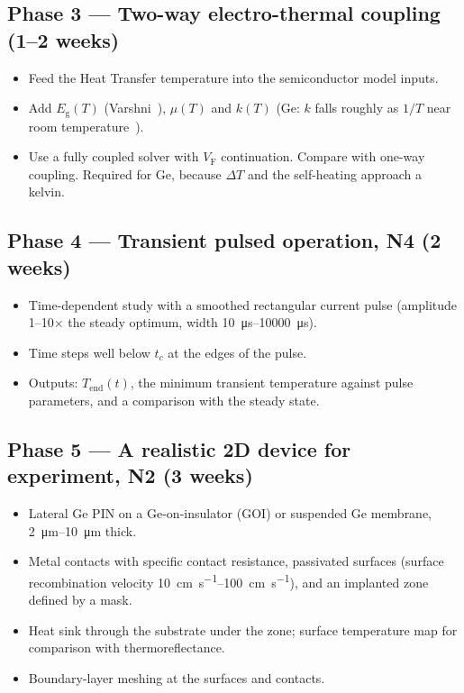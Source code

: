\documentclass[11pt,a4paper]{article}
\newcommand{\Eg}{E_{\mathrm{g}}}
\newcommand{\VF}{V_{\mathrm{F}}}
\begin{document}
\subsection*{Phase 3 --- Two-way electro-thermal coupling (1--2 weeks)}
\begin{itemize}
  \item Feed the Heat Transfer temperature into the semiconductor model inputs.
  \item Add $\Eg(T)$ (Varshni~\cite{varshni}), $\mu(T)$ and $k(T)$ (Ge: $k$ falls roughly as $1/T$ near room temperature~\cite{glassbrenner}).
  \item Use a fully coupled solver with $\VF$ continuation. Compare with one-way coupling. Required for Ge, because $\Delta T$ and the self-heating approach a kelvin.
\end{itemize}

\subsection*{Phase 4 --- Transient pulsed operation, N4 (2 weeks)}
\begin{itemize}
  \item Time-dependent study with a smoothed rectangular current pulse (amplitude 1--10$\times$ the steady optimum, width \SIrange{10}{10000}{\micro\second}).
  \item Time steps well below $t_c$ at the edges of the pulse.
  \item Outputs: $T_{\mathrm{end}}(t)$, the minimum transient temperature against pulse parameters, and a comparison with the steady state.
\end{itemize}

\subsection*{Phase 5 --- A realistic 2D device for experiment, N2 (3 weeks)}
\begin{itemize}
  \item Lateral Ge PIN on a Ge-on-insulator (GOI) or suspended Ge membrane, \SIrange{2}{10}{\micro\metre} thick.
  \item Metal contacts with specific contact resistance, passivated surfaces (surface recombination velocity \SIrange{10}{100}{\centi\metre\per\second}), and an implanted zone defined by a mask.
  \item Heat sink through the substrate under the zone; surface temperature map for comparison with thermoreflectance.
  \item Boundary-layer meshing at the surfaces and contacts.
\end{itemize}
\end{document}
